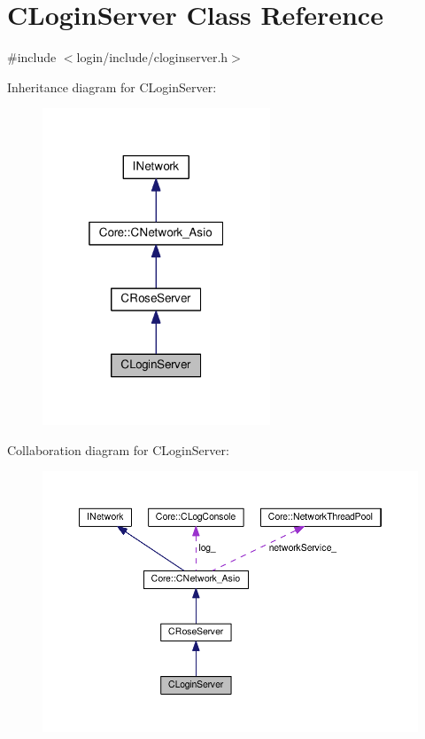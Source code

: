 \hypertarget{classCLoginServer}{}\section{C\+Login\+Server Class Reference}
\label{classCLoginServer}


{\ttfamily \#include $<$login/include/cloginserver.\+h$>$}



Inheritance diagram for C\+Login\+Server\+:
\nopagebreak
\begin{figure}[H]
\begin{center}
\leavevmode
\includegraphics[width=193pt]{classCLoginServer__inherit__graph}
\end{center}
\end{figure}


Collaboration diagram for C\+Login\+Server\+:
\nopagebreak
\begin{figure}[H]
\begin{center}
\leavevmode
\includegraphics[width=350pt]{classCLoginServer__coll__graph}
\end{center}
\end{figure}
